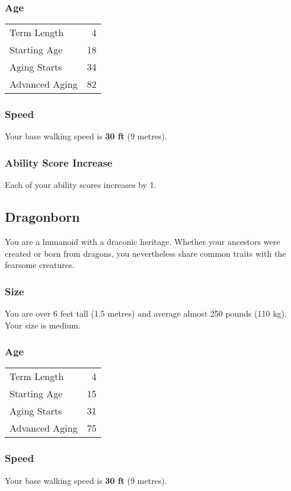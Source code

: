 \documentclass[10pt,twoside]{article}
\begin{document}
\begin{multicols}{2}
\subsubsection*{Age}
\begin{tabular}{ l r }
  Term Length & 4 \\
  Starting Age & 18 \\
  Aging Starts & 34 \\
  Advanced Aging & 82 \\
\end{tabular}

\subsubsection*{Speed}
Your base walking speed is \textbf{30 ft} (9 metres).

\subsubsection*{Ability Score Increase}
Each of your ability scores increases by 1.


\subsection{Dragonborn}

You are a humanoid with a draconic heritage. Whether your ancestors were created or born from dragons, you nevertheless share common traits with the fearsome creatures.

\subsubsection*{Size}
You are over 6 feet tall (1.5 metres) and average almost 250 pounds (110 kg). Your size is medium.

\subsubsection*{Age}
\begin{tabular}{ l r }
  Term Length & 4 \\
  Starting Age & 15 \\
  Aging Starts & 31 \\
  Advanced Aging & 75 \\
\end{tabular}

\subsubsection*{Speed}
Your base walking speed is \textbf{30 ft} (9 metres).


\end{multicols}
\end{document}
